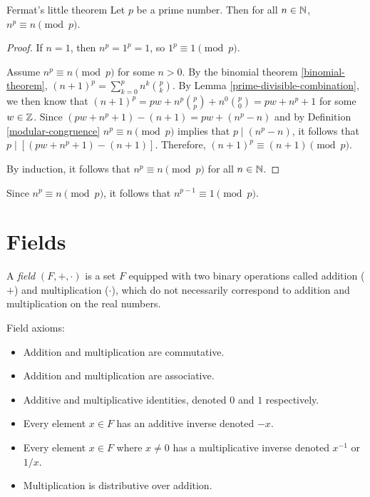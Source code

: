 \begin{thm}{Fermat's little theorem}\label{fermat-little-theorem}\proofbreak
    Let $p$ be a prime number. Then for all $n \in \mathbb{N}$, $n^p \equiv n \pmod p$.
\end{thm}

\begin{proof}
    If $n = 1$, then $n^p = 1^p = 1$, so $1^p \equiv 1 \pmod p$.

    Assume $n^p \equiv n \pmod p$ for some $n > 0$. By the binomial theorem \ref{binomial-theorem}, $(n+1)^p = \sum_{k=0}^pn^k\binom{p}{k}$. By Lemma \ref{prime-divisible-combination}, we then know that $(n+1)^p = pw + n^p\binom{p}{p} + n^0\binom{p}{0} = pw + n^p + 1$ for some $w \in \mathbb{Z}$. Since $(pw + n^p + 1) - (n + 1) = pw + (n^p - n)$ and by Definition \ref{modular-congruence} $n^p \equiv n \pmod p$ implies that $p \mid (n^p - n)$, it follows that $p \mid \left[(pw + n^p + 1) - (n + 1)\right]$. Therefore, $(n+1)^p \equiv (n+1) \pmod p$.

    By induction, it follows that $n^p \equiv n \pmod p$ for all $n \in \mathbb{N}$.
\end{proof}

\begin{cor}\label{fermat-little-corallary}
    Since $n^p \equiv n \pmod p$, it follows that $n^{p-1} \equiv 1 \pmod p$.
\end{cor}

\section{Fields}

\begin{defn}
    A \emph{field} $(F, +, \cdot)$ is a set $F$ equipped with two binary operations called addition ($+$) and multiplication ($\cdot$), which do not necessarily correspond to addition and multiplication on the real numbers.

    Field axioms:
    \begin{itemize}
        \item Addition and multiplication are commutative.
        \item Addition and multiplication are associative.
        \item Additive and multiplicative identities, denoted $0$ and $1$ respectively.
        \item Every element $x \in F$ has an additive inverse denoted $-x$.
        \item Every element $x \in F$ where $x \neq 0$ has a multiplicative inverse denoted $x^{-1}$ or $1/x$.
        \item Multiplication is distributive over addition.
    \end{itemize}
\end{defn}

